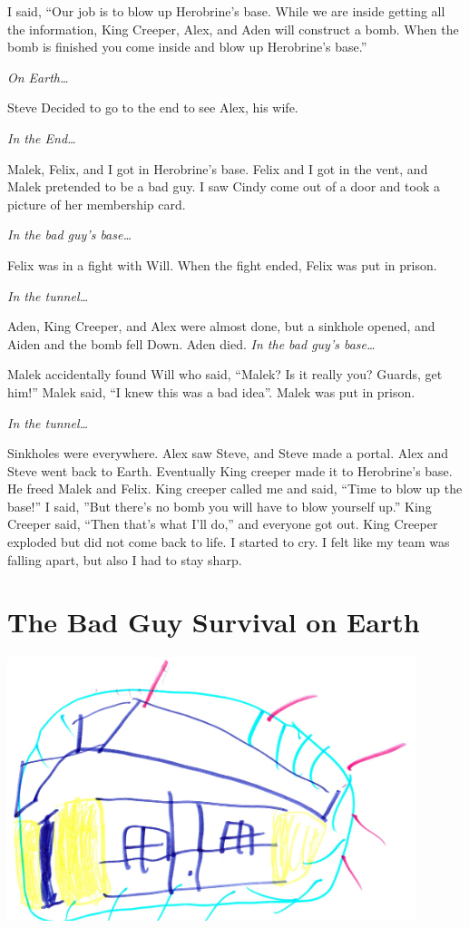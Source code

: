 \documentclass[12pt,twoside]{krantz}
\begin{document}
I said, ``Our job is to blow up Herobrine's base. While we are inside
getting all the information, King Creeper, Alex, and Aden will construct
a bomb. When the bomb is finished you come inside and blow up
Herobrine's base.''

\emph{On Earth\ldots{}}

Steve Decided to go to the end to see Alex, his wife.

\emph{In the End\ldots{}}

Malek, Felix, and I got in Herobrine's base. Felix and I got in the
vent, and Malek pretended to be a bad guy. I saw Cindy come out of a
door and took a picture of her membership card.

\emph{In the bad guy's base\ldots{}}

Felix was in a fight with Will. When the fight ended, Felix was put in
prison.

\emph{In the tunnel\ldots{}}

Aden, King Creeper, and Alex were almost done, but a sinkhole opened,
and Aiden and the bomb fell Down. Aden died. \emph{In the bad guy's
base\ldots{}}

Malek accidentally found Will who said, ``Malek? Is it really you?
Guards, get him!'' Malek said, ``I knew this was a bad idea''. Malek was
put in prison.

\emph{In the tunnel\ldots{}}

Sinkholes were everywhere. Alex saw Steve, and Steve made a portal. Alex
and Steve went back to Earth. Eventually King creeper made it to
Herobrine's base. He freed Malek and Felix. King creeper called me and
said, ``Time to blow up the base!'' I said, ''But there's no bomb you
will have to blow yourself up.'' King Creeper said, ``Then that's what
I'll do,'' and everyone got out. King Creeper exploded but did not come
back to life. I started to cry. I felt like my team was falling apart,
but also I had to stay sharp.

\hypertarget{the-bad-guy-survival-on-earth}{%
\section{The Bad Guy Survival on
Earth}\label{the-bad-guy-survival-on-earth}}

\includegraphics[width=4.6875in,height=\textheight]{img/herobrine-returns/10-base.jpg}
\end{document}
